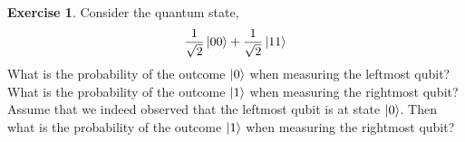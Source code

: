\documentclass[a4paper, 11pt]{article}
\theoremstyle{definition}
\newtheorem{exercise}{Exercise}
\begin{document}
\begin{exercise}
  Consider the quantum state,
  \begin{align*}
    \frac{1}{\sqrt{2}} \ket{00} + \frac{1}{\sqrt{2}} \ket{11}
  \end{align*}
  What is the probability of the outcome $\ket{0}$ when measuring the
  leftmost qubit? What is the probability of the outcome $\ket{1}$
  when measuring the rightmost qubit? Assume that we indeed observed
  that the leftmost qubit is at state $\ket{0}$. Then what is the
  probability of the outcome $\ket{1}$ when measuring the rightmost
  qubit?
\end{exercise}



\end{document}
